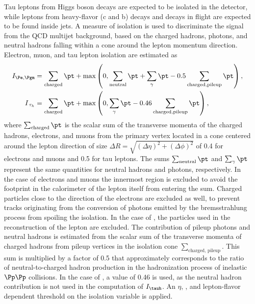 Tau leptons from Higgs boson decays are expected to be isolated in the detector, while leptons from heavy-flavor (c and b) decays and decays in flight are expected to be found inside jets. A measure of isolation is used to discriminate the signal from the QCD multijet background, based on the charged hadrons, photons, and neutral hadrons falling within a cone around the lepton momentum direction.
Electron, muon, and tau lepton isolation are estimated as
\begin{equation}\begin{aligned}
I_{\Pe,\Pgm} &=  \sum_{\rm charged}  \pt + \text{max}\left( 0, \sum_{\rm neutral}  \pt
                                        +  \sum_{\gamma} {\pt} - 0.5 \sum_{\rm charged, pileup} \pt  \right ), \\
I_{\Tau} &=  \sum_{\rm charged}  \pt + \text{max}\left( 0, \sum_{\gamma} {\pt} - 0.46 \sum_{\rm charged, pileup} \pt  \right ),
\label{eq:reconstruction_isolation}
\end{aligned}\end{equation}
where $\sum_\text{charged}\pt$ is the scalar sum of the transverse momenta of the charged hadrons, electrons, and muons from the primary vertex located in a cone centered around the lepton direction of size $\Delta R = \sqrt{(\Delta\eta)^2+(\Delta\phi)^2}$ of 0.4 for electrons and muons and 0.5 for tau leptons.
The sums $\sum_\text{neutral}\pt$ and $\sum_{\gamma} \pt$ represent the same quantities for neutral hadrons and photons, respectively. In the case of electrons and muons the innermost region is excluded
to avoid the footprint in the calorimeter of the lepton itself from entering the sum.
Charged particles close to the direction of the electrons are excluded as well, to prevent tracks originating from the conversion of photons emitted by the bremsstrahlung process from spoiling the isolation. In the case of \Tau, the particles used in the reconstruction of the lepton are excluded. The contribution of pileup photons and neutral hadrons
is estimated from the scalar sum of the transverse momenta of charged hadrons from pileup vertices in the isolation cone $\sum_\text{charged, pileup}$. This sum is multiplied by a factor of 0.5 that approximately corresponds to the ratio of neutral-to-charged hadron production in the hadronization process of inelastic $\Pp\Pp$ collisions. In the case of \Tau, a value of 0.46 is used, as the neutral hadron contribution is not used in the computation of $I_{\tauh}$. An $\eta$, \pt, and lepton-flavor dependent threshold on the isolation variable is applied.


